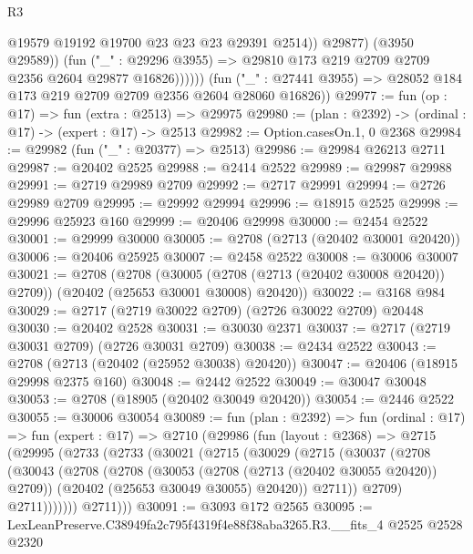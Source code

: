\begin{lexlean}{R3}
\begin{coremodule}
                        @19579
                        @19192
                        @19700
                        @23
                        @23
                        @23
                        @29391
                        @2514))
                    @29877)
                  (@3950 @29589))
                (fun ("_" : @29296 @3955) =>
                @29810 @173 @219 @2709 @2709 @2356 @2604 @29877 @16826))))))
      (fun ("_" : @27441 @3955) => @28052 @184 @173 @219 @2709 @2709 @2356 @2604 @28060 @16826))
@29977 := fun (op : @17) => fun (extra : @2513) => @29975
@29980 := (plan : @2392) -> (ordinal : @17) -> (expert : @17) -> @2513
@29982 := Option.casesOn.{1, 0} @2368
@29984 := @29982 (fun ("_" : @20377) => @2513)
@29986 := @29984 @26213 @2711
@29987 := @20402 @2525
@29988 := @2414 @2522
@29989 := @29987 @29988
@29991 := @2719 @29989 @2709
@29992 := @2717 @29991
@29994 := @2726 @29989 @2709
@29995 := @29992 @29994
@29996 := @18915 @2525
@29998 := @29996 @25923 @160
@29999 := @20406 @29998
@30000 := @2454 @2522
@30001 := @29999 @30000
@30005 := @2708 (@2713 (@20402 @30001 @20420))
@30006 := @20406 @25925
@30007 := @2458 @2522
@30008 := @30006 @30007
@30021 := @2708
    (@2708
      (@30005 (@2708 (@2713 (@20402 @30008 @20420)) @2709))
      (@20402 (@25653 @30001 @30008) @20420))
@30022 := @3168 @984
@30029 := @2717 (@2719 @30022 @2709) (@2726 @30022 @2709) @20448
@30030 := @20402 @2528
@30031 := @30030 @2371
@30037 := @2717 (@2719 @30031 @2709) (@2726 @30031 @2709)
@30038 := @2434 @2522
@30043 := @2708 (@2713 (@20402 (@25952 @30038) @20420))
@30047 := @20406 (@18915 @29998 @2375 @160)
@30048 := @2442 @2522
@30049 := @30047 @30048
@30053 := @2708 (@18905 (@20402 @30049 @20420))
@30054 := @2446 @2522
@30055 := @30006 @30054
@30089 := fun (plan : @2392) =>
  fun (ordinal : @17) =>
  fun (expert : @17) =>
  @2710
    (@29986
      (fun (layout : @2368) =>
      @2715
        (@29995
          (@2733
            (@2733
              (@30021
                (@2715
                  (@30029
                    (@2715
                      (@30037
                        (@2708
                          (@30043
                            (@2708
                              (@2708
                                (@30053 (@2708 (@2713 (@20402 @30055 @20420)) @2709))
                                (@20402 (@25653 @30049 @30055) @20420))
                              @2711))
                          @2709)
                        @2711)))))))
          @2711)))
@30091 := @3093 @172 @2565
@30095 := LexLeanPreserve.C38949fa2c795f4319f4e88f38aba3265.R3.__fits_4 @2525 @2528 @2320

\end{coremodule}
\end{lexlean}

